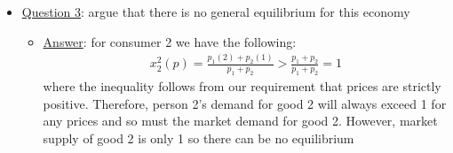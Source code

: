 \documentclass{article}
\begin{document}
  \begin{itemize}
    \item  \underline{Question 3}: argue that there is no general equilibrium for this economy
    \begin{itemize}
      \item  \underline{Answer}: for consumer 2 we have the following:
      \begin{gather*}
        x_{2}^{2}(p) = \frac{p_{1}(2) + p_{2}(1)}{p_{1} + p_{2}} > \frac{p_{1} + p_{2}}{p_{1} + p_{2}} = 1
      \end{gather*}
      where the inequality follows from our requirement that prices are strictly positive. Therefore, person 2's demand for good 2 will always exceed 1 for any prices and so must the market demand for good 2. However, market supply of good 2 is only 1 so there can be no equilibrium
    \end{itemize}
  \end{itemize}
\par
\vspace{6mm}
\end{document}
